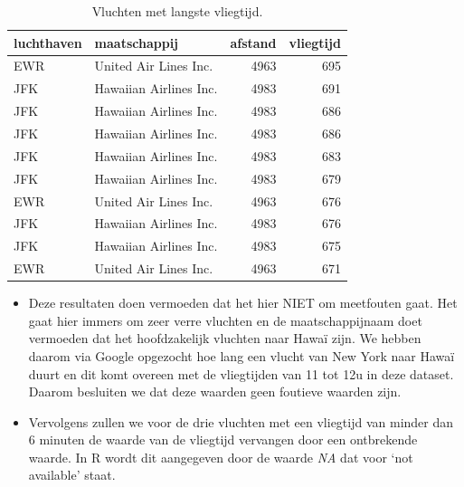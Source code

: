 \documentclass[]{tufte-book}
\newenvironment{Shaded}{}{}
\newcommand{\DecValTok}[1]{\textcolor[rgb]{0.25,0.63,0.44}{#1}}
\newcommand{\KeywordTok}[1]{\textcolor[rgb]{0.00,0.44,0.13}{\textbf{#1}}}
\newcommand{\NormalTok}[1]{#1}
\newcommand{\OperatorTok}[1]{\textcolor[rgb]{0.40,0.40,0.40}{#1}}
\newcommand{\StringTok}[1]{\textcolor[rgb]{0.25,0.44,0.63}{#1}}
\begin{document}
\begin{Shaded}
\end{Shaded}

\begin{table}

\caption{\label{tab:5-12b}Vluchten met langste vliegtijd.}
\centering
\fontsize{10}{12}\selectfont
\begin{tabular}[t]{llrr}
\toprule
luchthaven & maatschappij & afstand & vliegtijd\\
\midrule
EWR & United Air Lines Inc. & 4963 & 695\\
JFK & Hawaiian Airlines Inc. & 4983 & 691\\
JFK & Hawaiian Airlines Inc. & 4983 & 686\\
JFK & Hawaiian Airlines Inc. & 4983 & 686\\
JFK & Hawaiian Airlines Inc. & 4983 & 683\\
\addlinespace
JFK & Hawaiian Airlines Inc. & 4983 & 679\\
EWR & United Air Lines Inc. & 4963 & 676\\
JFK & Hawaiian Airlines Inc. & 4983 & 676\\
JFK & Hawaiian Airlines Inc. & 4983 & 675\\
EWR & United Air Lines Inc. & 4963 & 671\\
\bottomrule
\end{tabular}
\end{table}

\begin{itemize}
\item
  Deze resultaten doen vermoeden dat het hier NIET om meetfouten gaat. Het gaat hier immers om zeer verre vluchten en de maatschappijnaam doet vermoeden dat het hoofdzakelijk vluchten naar Hawaï zijn. We hebben daarom via Google opgezocht hoe lang een vlucht van New York naar Hawaï duurt en dit komt overeen met de vliegtijden van 11 tot 12u in deze dataset. Daarom besluiten we dat deze waarden geen foutieve waarden zijn.
\item
  Vervolgens zullen we voor de drie vluchten met een vliegtijd van minder dan 6 minuten de waarde van de vliegtijd vervangen door een ontbrekende waarde. In R wordt dit aangegeven door de waarde \emph{NA} dat voor `not available' staat.
\end{itemize}
\end{document}
